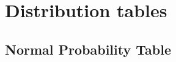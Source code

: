 \chapter{Distribution tables}
\label{distributionTables}



\clearpage
\thispagestyle{empty}

\section*{Normal Probability Table}
\label{normalProbabilityTable}

\thispagestyle{empty}




